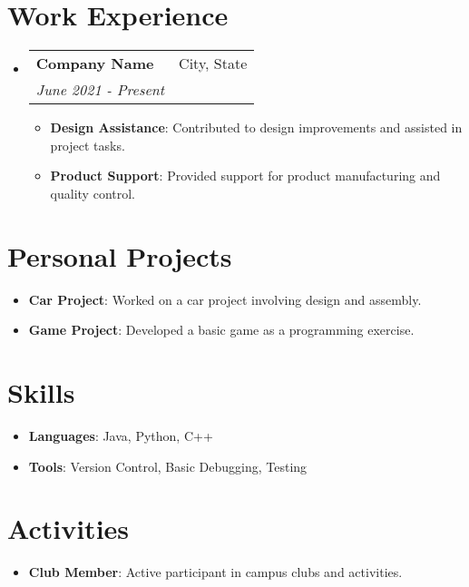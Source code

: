 \documentclass[letterpaper,11pt]{article}
\makeatletter
\newcommand{\resumeItem}[2]{
  \item\small{
    \textbf{#1}{: #2 \vspace{-2pt}}
  }
}
\newcommand{\resumeSubheading}[4]{
  \vspace{-1pt}\item
    \begin{tabular*}{0.97\textwidth}{l@{\extracolsep{\fill}}r}
      \textbf{#1} & #2 \\
      \textit{\small#3} & \textit{\small #4} \\
    \end{tabular*}\vspace{-5pt}
}
\newcommand{\resumeSubItem}[2]{\resumeItem{#1}{#2}\vspace{-4pt}}
\newcommand{\resumeSubHeadingListStart}{\begin{itemize}[leftmargin=*,label={}]}
\newcommand{\resumeSubHeadingListEnd}{\end{itemize}}
\newcommand{\resumeItemListStart}{\begin{itemize}[label={\textbullet}]}
\newcommand{\resumeItemListEnd}{\end{itemize}\vspace{-5pt}}
\makeatother
\begin{document}
\section{Work Experience}
  \resumeSubHeadingListStart
    \resumeSubheading
      {Company Name}{City, State}
      {June 2021 - Present}{}
      \resumeItemListStart
        \resumeItem{Design Assistance}
          {Contributed to design improvements and assisted in project tasks.}
        \resumeItem{Product Support}
          {Provided support for product manufacturing and quality control.}
      \resumeItemListEnd
  \resumeSubHeadingListEnd

\section{Personal Projects}
  \resumeSubHeadingListStart
    \resumeSubItem{Car Project}
      {Worked on a car project involving design and assembly.}
    \resumeSubItem{Game Project}
      {Developed a basic game as a programming exercise.}
  \resumeSubHeadingListEnd

\section{Skills}
  \resumeSubHeadingListStart
    \resumeSubItem{Languages}
        {Java, Python, C++}
    \resumeSubItem{Tools}
        {Version Control, Basic Debugging, Testing}
  \resumeSubHeadingListEnd

\section{Activities}
  \resumeSubHeadingListStart
    \resumeSubItem{Club Member}
      {Active participant in campus clubs and activities.}
  \resumeSubHeadingListEnd
\end{document}
